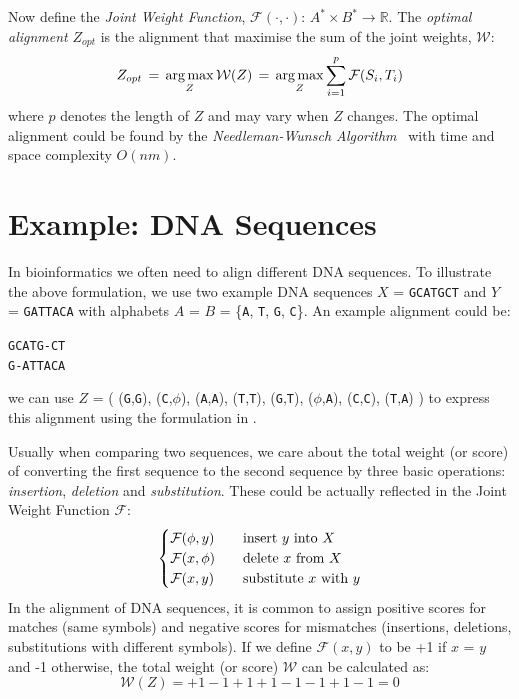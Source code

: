 Now define the \textit{Joint Weight Function}, $\mathcal{F}(\cdot,\cdot)$: $A^* \times B^* \to \mathbb{R}$. The \textit{optimal alignment} $Z_{opt}$ is the alignment that maximise the sum of the joint weights, $\mathcal{W}$:
\begin{equation}
  Z_{opt} \,=\, \operatorname*{arg\,max}_{Z} \mathcal{W}(Z) \,=\, \operatorname*{arg\,max}_{Z} \sum_{i=1}^{p} \mathcal{F}(S_i,T_i)
\end{equation}
where $p$ denotes the length of $Z$ and may vary when $Z$ changes. The optimal alignment could be found by the \textit{Needleman-Wunsch Algorithm}~\cite{needleman1970general} with time and space complexity $O(nm)$.

\section{Example: DNA Sequences}

In bioinformatics we often need to align different DNA sequences. To illustrate the above formulation, we use two example DNA sequences $X$ = \texttt{GCATGCT} and $Y$ = \texttt{GATTACA} with alphabets $A$ = $B$ = \{\texttt{A}, \texttt{T}, \texttt{G}, \texttt{C}\}. An example alignment could be:
\begin{center}
  \texttt{GCATG-CT}\\
  \texttt{G-ATTACA}
\end{center}
we can use $Z$ = (
  (\texttt{G},\texttt{G}),
  (\texttt{C},$\phi$),
  (\texttt{A},\texttt{A}),
  (\texttt{T},\texttt{T}),
  (\texttt{G},\texttt{T}),
  ($\phi$,\texttt{A}),
  (\texttt{C},\texttt{C}),
  (\texttt{T},\texttt{A})
) to express this alignment using the formulation in .

Usually when comparing two sequences, we care about the total weight (or score) of converting the first sequence to the second sequence by three basic operations: \textit{insertion}, \textit{deletion} and \textit{substitution}. These could be actually reflected in the Joint Weight Function $\mathcal{F}$:
\[
  \begin{cases}
    \mathcal{F}(\phi,y) & \text{\quad insert } y \text{ into } X \\
    \mathcal{F}(x,\phi) & \text{\quad delete } x \text{ from } X \\
    \mathcal{F}(x,y) & \text{\quad substitute } x \text{ with } y
  \end{cases}
\]
In the alignment of DNA sequences, it is common to assign positive scores for matches (same symbols) and negative scores for mismatches (insertions, deletions, substitutions with different symbols). If we define $\mathcal{F}(x,y)$ to be +1 if $x$ = $y$ and -1 otherwise, the total weight (or score) $\mathcal{W}$ can be calculated as:
\[ \mathcal{W}(Z) = + 1 - 1 + 1 + 1 - 1 - 1 + 1 - 1 = 0 \]


